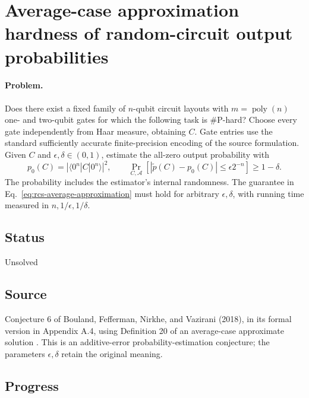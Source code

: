 \section{Average-case approximation hardness of random-circuit output probabilities}
\label{sec:op_94fc1874fe23df16}

\paragraph{Problem.}
Does there exist a fixed family of $n$-qubit circuit layouts with
$m=\operatorname{poly}(n)$ one- and two-qubit gates for which the following
task is $\#\mathrm{P}$-hard? Choose every gate independently from Haar
measure, obtaining $C$. Gate entries use the standard sufficiently accurate finite-precision encoding of the source formulation. Given $C$ and $\epsilon,\delta\in(0,1)$, estimate
the all-zero output probability with
\begin{equation}
  p_0(C)=|\langle0^n|C|0^n\rangle|^2,\qquad
  \Pr_{C,\mathcal A}[|\widetilde p(C)-p_0(C)|\leq\epsilon 2^{-n}]\geq1-\delta.
  \label{eq:rcs-average-approximation}
\end{equation}
The probability includes the estimator's internal randomness. The guarantee in Eq.~\eqref{eq:rcs-average-approximation} must hold for
arbitrary $\epsilon,\delta$, with running time measured in
$n,1/\epsilon,1/\delta$.

\subsection*{Status}

Unsolved

\subsection*{Source}

Conjecture 6 of Bouland, Fefferman, Nirkhe, and Vazirani (2018), in its
formal version in Appendix A.4, using Definition 20 of an average-case
approximate solution .
This is an additive-error probability-estimation conjecture; the parameters
$\epsilon,\delta$ retain the original meaning.

\subsection*{Progress}

